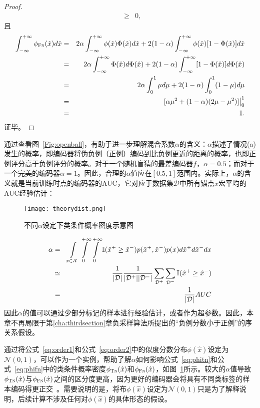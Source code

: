 \begin{lemma}[类条件概率密度]
\begin{proof}
\begin{eqnarray}
		&\geq& 0,
	\end{eqnarray}
且
	\begin{eqnarray}
		\int_{-\infty}^{+\infty}\phi_{\textsc{Fn}}(\hat{x})d\hat x &=& 2\alpha\int_{-\infty}^{+\infty}  \phi(\hat{x}) \Phi(\hat{x})d\hat x +2(1-\alpha)\int_{-\infty}^{+\infty}\phi(\hat{x}) [1-\Phi(\hat{x})] d\hat x \nonumber \\
		&=& 2\alpha\int_{-\infty}^{+\infty} \Phi(\hat{x})d\Phi(\hat{x}) +2(1-\alpha)\int_{-\infty}^{+\infty}[1-\Phi(\hat{x})] d\Phi(\hat{x}) \nonumber \\
		&=& 2\alpha\int_{0}^{1}  \mu d\mu +2(1-\alpha)\int_{0}^{1} (1-\mu) d\mu \nonumber \\
		&=& [\alpha \mu^2 + (1-\alpha) (2\mu - \mu^2) ]\big|_0^1 \nonumber \\
		&=&1.
	\end{eqnarray}
证毕。
\end{proof}
\end{lemma}

通过查看图~\ref{Fig:openball}，有助于进一步理解混合系数$\alpha$的含义：$\alpha$描述了情况(a)发生的概率，即编码器将伪负例（正例）编码到比负例更近的距离的概率，也即正例评分高于负例评分的概率。对于一个随机盲猜的最差编码器$ f $，$\alpha=0.5$；而对于一个完美的编码器$\alpha=1$。因此，合理的$\alpha$值应在$[0.5, 1]$范围内。实际上，$\alpha$的含义就是当前训练时点的编码器的AUC，它对应于数据集$\mathcal{D}$中所有锚点$ x $宏平均的AUC经验估计：
\begin{figure}[!]
	\centering
	\texttt{[image: theorydist.png]}
	\caption{不同$\alpha$设定下类条件概率密度示意图}
	\label{Fig:theorydist}
\end{figure}
\begin{eqnarray}
	\small
	\alpha &=& \int\limits_{x \in \mathcal{X}}  \int\limits_{0}^{+\infty} \int\limits_{0}^{+\infty} \mathbb I (\hat{x}^+ \ge \hat{x}^-)  p(\hat{x}^+ , \hat{x}^-) p(x) d\hat{x}^+  d\hat{x}^- dx\nonumber\\
	&\simeq& \frac{1}{|\mathcal{D}|} \frac{1}{|\mathcal{D}^+| |\mathcal{D}^-|} \sum_{\mathcal{D}^+}\sum_{\mathcal{D}^-}  \mathbb I (\hat{x}^+ \ge \hat{x}^-) \nonumber \\
	&=& \frac{1}{|\mathcal{D}|} AUC
\end{eqnarray}
因此$\alpha$的值可以通过少部分标记的样本进行经验估计，或者作为超参数。因此，本章不再局限于第\ref{cha:thirdsection}章负采样算法所提出的“负例分数小于正例”的序关系假设。

通过将公式~\eqref{eq:order1}和公式~\eqref{eq:order2}中的似度分数分布$\phi(\hat{x})$设定为$\mathcal{N}(0,1)$，可以作为一个实例，帮助了解$\alpha$如何影响公式~\eqref{eq:phitn}和公式~\eqref{eq:phifn}中的类条件概率密度$\phi_{\textsc{Tn}}(\hat{x})$和$\phi_{\textsc{Fn}}(\hat{x})$，如图~\ref{Fig:theorydist}所示。较大的$\alpha$值导致$\phi_{\textsc{Tn}}(\hat{x})$与$\phi_{\textsc{Fn}}(\hat{x})$之间的区分度更高，因为更好的编码器会将具有不同类标签的样本编码得更正交~\cite{Chuang:2020:NIPS}。需要说明的是，将布$\phi(\hat{x})$设定为$\mathcal{N}(0,1)$只是为了解释说明，后续计算不涉及任何对$\phi(\hat{x})$的具体形态的假设。


